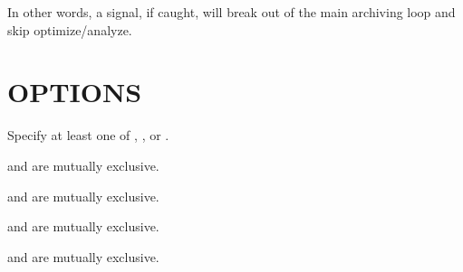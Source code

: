 \documentclass[letterpaper,10pt,english]{sphinxmanual}
\begin{document}
In other words, a signal, if caught, will break out of the main archiving
loop and skip optimize/analyze.


\section{OPTIONS}
\label{\detokenize{mariadb-archiver:options}}
Specify at least one of {\hyperref[\detokenize{mariadb-archiver:cmdoption-mariadb-archiver-dest}]{}}, {\hyperref[\detokenize{mariadb-archiver:cmdoption-mariadb-archiver-file}]{}}, or {\hyperref[\detokenize{mariadb-archiver:cmdoption-mariadb-archiver-purge}]{}}.

{\hyperref[\detokenize{mariadb-archiver:cmdoption-mariadb-archiver-ignore}]{}} and {\hyperref[\detokenize{mariadb-archiver:cmdoption-mariadb-archiver-replace}]{}} are mutually exclusive.

{\hyperref[\detokenize{mariadb-archiver:cmdoption-mariadb-archiver-txn-size}]{}} and {\hyperref[\detokenize{mariadb-archiver:cmdoption-mariadb-archiver-commit-each}]{}} are mutually exclusive.

{\hyperref[\detokenize{mariadb-archiver:cmdoption-mariadb-archiver-low-priority-insert}]{}} and {\hyperref[\detokenize{mariadb-archiver:cmdoption-mariadb-archiver-delayed-insert}]{}} are mutually exclusive.

{\hyperref[\detokenize{mariadb-archiver:cmdoption-mariadb-archiver-share-lock}]{}} and {\hyperref[\detokenize{mariadb-archiver:cmdoption-mariadb-archiver-for-update}]{}} are mutually exclusive.
\end{document}
